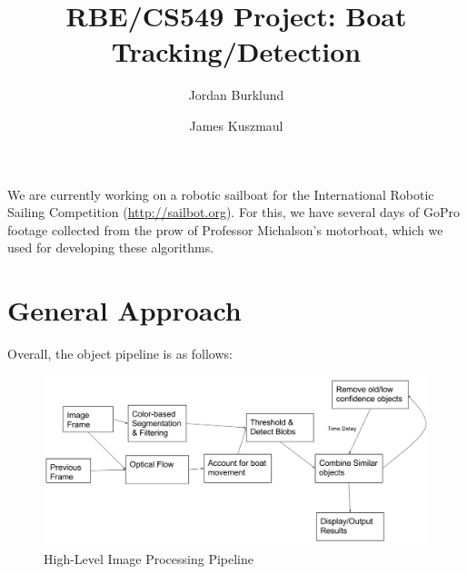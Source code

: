 \documentclass{article}
\title{RBE/CS549 Project: Boat Tracking/Detection}
\author{Jordan Burklund \and James Kuszmaul}
\begin{document}
\maketitle

We are currently working on a robotic sailboat for the
International Robotic Sailing Competition (\url{http://sailbot.org}). For this,
we have several days of GoPro footage collected from the prow of Professor
Michalson's motorboat, which we used for developing these algorithms.

\section{General Approach}

Overall, the object pipeline is as follows:
\begin{figure}[H]
\includegraphics[width=16cm]{algorithm_flowchart}
\centering
\caption{High-Level Image Processing Pipeline}
\end{figure}
\end{document}

